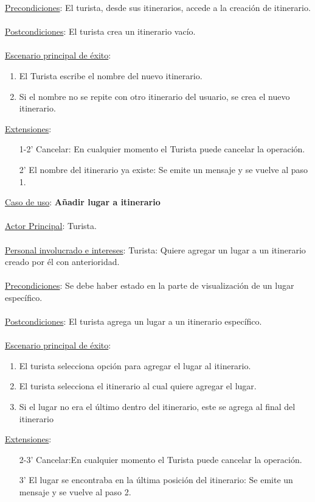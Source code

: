 \documentclass[12pt]{article}
\begin{document}
\underline{Precondiciones}: El turista, desde sus itinerarios, accede a la creación de itinerario.\\\\
\underline{Postcondiciones}: El turista crea un itinerario vacío.\\\\
\underline{Escenario principal de éxito}:
\begin{enumerate}
\item El Turista escribe el nombre del nuevo itinerario.
\item Si el nombre no se repite con otro itinerario del usuario, se crea el nuevo itinerario.
\end{enumerate}
\underline{Extensiones}:
\begin{enumerate}
\item[1-2'] Cancelar: En cualquier momento el Turista puede cancelar la operación. 
\item[2'] El nombre del itinerario ya existe: Se emite un mensaje y se vuelve al paso 1.
\end{enumerate}
\underline{Caso de uso}: \textbf{Añadir lugar a itinerario}\\\\
\underline{Actor Principal}: Turista.\\\\
\underline{Personal involucrado e intereses}: Turista: Quiere agregar un lugar a un itinerario creado por él con anterioridad.\\\\
\underline{Precondiciones}:  Se debe haber estado en la parte de visualización de un lugar específico.\\\\
\underline{Postcondiciones}: El turista agrega un lugar a un itinerario específico.\\\\
\underline{Escenario principal de éxito}:
\begin{enumerate}
\item El turista selecciona opción para agregar el lugar al itinerario.
\item El turista selecciona el itinerario al cual quiere agregar el lugar.
\item Si el lugar no era el último dentro del itinerario, este se agrega al final del itinerario
\end{enumerate}
\underline{Extensiones}:
\begin{enumerate}
\item[2-3'] Cancelar:En cualquier momento el Turista puede cancelar la operación. 
\item[3'] El lugar se encontraba en la última posición del itinerario: Se emite un mensaje y se vuelve al paso 2.
\end{enumerate}
\end{document}

